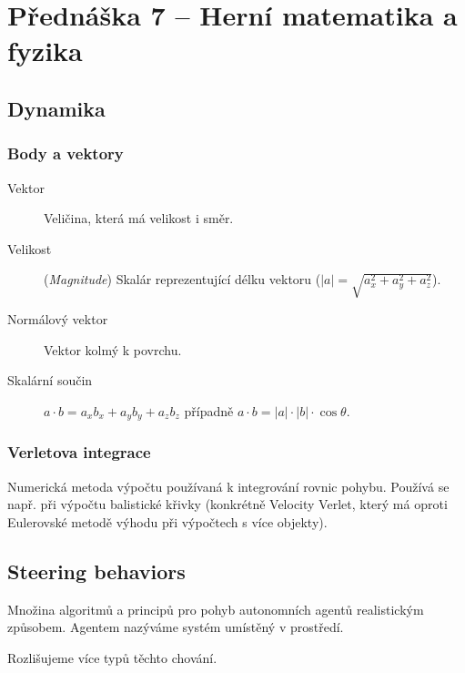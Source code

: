 \section*{Přednáška 7 -- Herní matematika a fyzika}

\subsection*{Dynamika}

\medskip

\subsubsection*{Body a vektory}

\medskip

\begin{description}
    \item[Vektor] Veličina, která má velikost i směr.
    \item[Velikost] (\textit{Magnitude}) Skalár reprezentující délku vektoru (\(|a| = \sqrt{a_x^2 + a_y^2 + a_z^2}\)).
    \item[Normálový vektor] Vektor kolmý k povrchu.
    \item[Skalární součin] \(a \cdot b = a_xb_x + a_yb_y + a_zb_z\) případně \(a \cdot b = |a| \cdot |b| \cdot \cos{\theta}\).
\end{description}

\subsubsection*{Verletova integrace}

Numerická metoda výpočtu používaná k integrování rovnic pohybu.
Používá se např. při výpočtu balistické křivky (konkrétně Velocity Verlet, který má oproti Eulerovské metodě výhodu při výpočtech s více objekty).

\subsection*{Steering behaviors}

Množina algoritmů a principů pro pohyb autonomních agentů realistickým způsobem.
Agentem nazýváme systém umístěný v prostředí.

Rozlišujeme více typů těchto chování.

